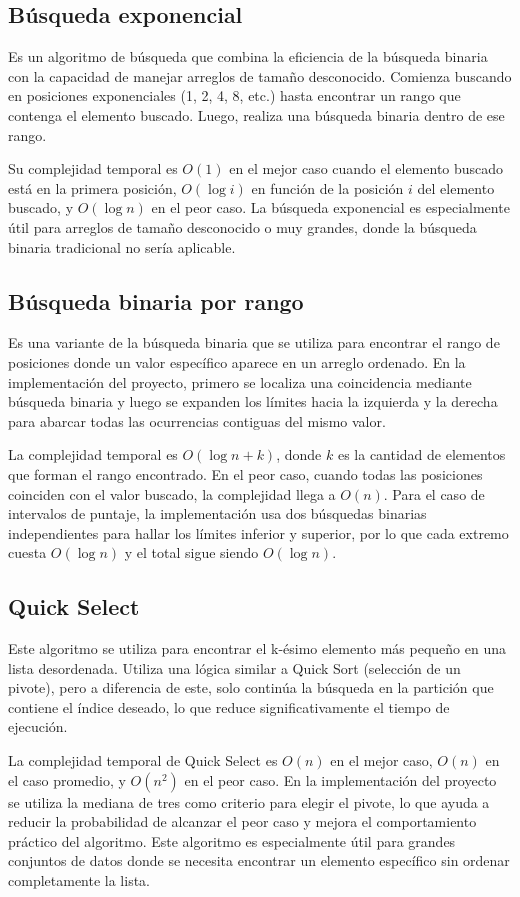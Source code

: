 \subsection{Búsqueda exponencial}
Es un algoritmo de búsqueda que combina la eficiencia de la búsqueda binaria con la capacidad de manejar arreglos de tamaño desconocido. Comienza buscando en posiciones exponenciales (1, 2, 4, 8, etc.) hasta encontrar un rango que contenga el elemento buscado. Luego, realiza una búsqueda binaria dentro de ese rango.

Su complejidad temporal es \(O(1)\) en el mejor caso cuando el elemento buscado está en la primera posición, \(O(\log i)\) en función de la posición \(i\) del elemento buscado, y \(O(\log n)\) en el peor caso. La búsqueda exponencial es especialmente útil para arreglos de tamaño desconocido o muy grandes, donde la búsqueda binaria tradicional no sería aplicable.

\subsection{Búsqueda binaria por rango}
Es una variante de la búsqueda binaria que se utiliza para encontrar el rango de posiciones donde un valor específico aparece en un arreglo ordenado. En la implementación del proyecto, primero se localiza una coincidencia mediante búsqueda binaria y luego se expanden los límites hacia la izquierda y la derecha para abarcar todas las ocurrencias contiguas del mismo valor.

La complejidad temporal es \(O(\log n + k)\), donde \(k\) es la cantidad de elementos que forman el rango encontrado. En el peor caso, cuando todas las posiciones coinciden con el valor buscado, la complejidad llega a \(O(n)\). Para el caso de intervalos de puntaje, la implementación usa dos búsquedas binarias independientes para hallar los límites inferior y superior, por lo que cada extremo cuesta \(O(\log n)\) y el total sigue siendo \(O(\log n)\).

\subsection{Quick Select}
Este algoritmo se utiliza para encontrar el k-ésimo elemento más pequeño en una lista desordenada. Utiliza una lógica similar a Quick Sort (selección de un pivote), pero a diferencia de este, solo continúa la búsqueda en la partición que contiene el índice deseado, lo que reduce significativamente el tiempo de ejecución.

La complejidad temporal de Quick Select es \(O(n)\) en el mejor caso, \(O(n)\) en el caso promedio, y \(O(n^2)\) en el peor caso. En la implementación del proyecto se utiliza la mediana de tres como criterio para elegir el pivote, lo que ayuda a reducir la probabilidad de alcanzar el peor caso y mejora el comportamiento práctico del algoritmo. Este algoritmo es especialmente útil para grandes conjuntos de datos donde se necesita encontrar un elemento específico sin ordenar completamente la lista.